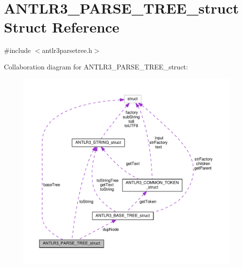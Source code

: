 \hypertarget{struct_a_n_t_l_r3___p_a_r_s_e___t_r_e_e__struct}{\section{A\-N\-T\-L\-R3\-\_\-\-P\-A\-R\-S\-E\-\_\-\-T\-R\-E\-E\-\_\-struct Struct Reference}
\label{struct_a_n_t_l_r3___p_a_r_s_e___t_r_e_e__struct}
}


{\ttfamily \#include $<$antlr3parsetree.\-h$>$}



Collaboration diagram for A\-N\-T\-L\-R3\-\_\-\-P\-A\-R\-S\-E\-\_\-\-T\-R\-E\-E\-\_\-struct\-:
\nopagebreak
\begin{figure}[H]
\begin{center}
\leavevmode
\includegraphics[width=350pt]{struct_a_n_t_l_r3___p_a_r_s_e___t_r_e_e__struct__coll__graph}
\end{center}
\end{figure}

